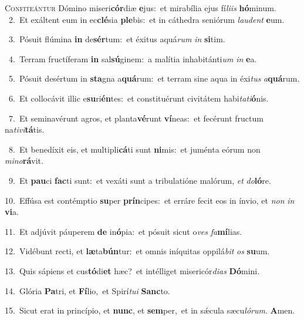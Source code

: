 \lettrine{\initial\textcolor{\initialcolor}{C}}{onfiteántur} Dómino miseri\-\textbf{cór}\-diæ \textbf{e}\-jus:~\star et mirabília ejus fí\-\textit{li}\-\textit{is} \textbf{hó}\-minum.\\
{\numbfont\textcolor{\numbcolor}{~2.}}~Et exáltent eum in ec\-\textbf{clé}\-sia \textbf{ple}\-bis:~\star et in cáthedra seniórum \textit{lau}\-\textit{dent} \textbf{e}\-um.\par
{\numbfont\textcolor{\numbcolor}{~3.}}~Pósuit flúmina \textbf{in} de\-\textbf{sér}\-tum:~\star et éxitus aquá\textit{rum} \textit{in} \textbf{si}\-tim.\par
{\numbfont\textcolor{\numbcolor}{~4.}}~Terram fructíferam \textbf{in} sal\-\textbf{sú}\-ginem:~\star a malítia inhabitánti\textit{um} \textit{in} \textbf{e}\-a.\par
{\numbfont\textcolor{\numbcolor}{~5.}}~Pósuit desértum in \textbf{sta}\-gna a\-\textbf{quá}\-rum:~\star et terram sine aqua in éxi\textit{tus} \textit{a}\-\textbf{quá}rum.\par
{\numbfont\textcolor{\numbcolor}{~6.}}~Et collocávit illic e\-\textbf{su}\-ri\-\textbf{én}\-tes:~\star et constituérunt civitátem habi\-\textit{ta}\-\textit{ti}\textbf{ó}nis.\par
{\numbfont\textcolor{\numbcolor}{~7.}}~Et seminavérunt agros, et planta\-\textbf{vé}\-runt \textbf{ví}\-neas:~\star et fecérunt fructum na\-\textit{ti}\-\textit{vi}\textbf{tá}tis.\par
{\numbfont\textcolor{\numbcolor}{~8.}}~Et benedíxit eis, et multipli\-\textbf{cá}\-ti sunt \textbf{ni}\-mis:~\star et juménta eórum non \textit{mi}\-\textit{no}\textbf{rá}vit.\par
{\numbfont\textcolor{\numbcolor}{~9.}}~Et \textbf{pau}\-ci \textbf{fac}\-ti sunt:~\star et vexáti sunt a tribulatióne malórum, \textit{et} \textit{do}\-\textbf{ló}re.\par
{\numbfont\textcolor{\numbcolor}{10.}}~Effúsa est contémptio \textbf{su}\-per \textbf{prín}\-cipes:~\star et erráre fecit eos in ínvio, et \textit{non} \textit{in} \textbf{vi}\-a.\par
{\numbfont\textcolor{\numbcolor}{11.}}~Et adjúvit páuperem \textbf{de} in\-\textbf{ó}\-pia:~\star et pósuit sicut o\textit{ves} \textit{fa}\-\textbf{mí}lias.\par
{\numbfont\textcolor{\numbcolor}{12.}}~Vidébunt recti, et \textbf{læ}\-ta\-\textbf{bún}\-tur:~\star et omnis iníquitas oppilá\textit{bit} \textit{os} \textbf{su}\-um.\par
{\numbfont\textcolor{\numbcolor}{13.}}~Quis sápiens et cus\-\textbf{tó}\-di\textbf{et} hæc?~\star et intélliget misericór\-\textit{di}\-\textit{as} \textbf{Dó}\-mini.\par
{\numbfont\textcolor{\numbcolor}{14.}}~Glória \textbf{Pa}\-tri, et \textbf{Fí}\-lio,~\star et Spirí\-\textit{tu}\-\textit{i} \textbf{Sanc}\-to.\par
{\numbfont\textcolor{\numbcolor}{15.}}~Sicut erat in princípio, et \textbf{nunc}\-, et \textbf{sem}\-per,~\star et in sǽcula sæcu\-\textit{ló}\-\textit{rum}. \textbf{A}\-men.\par
